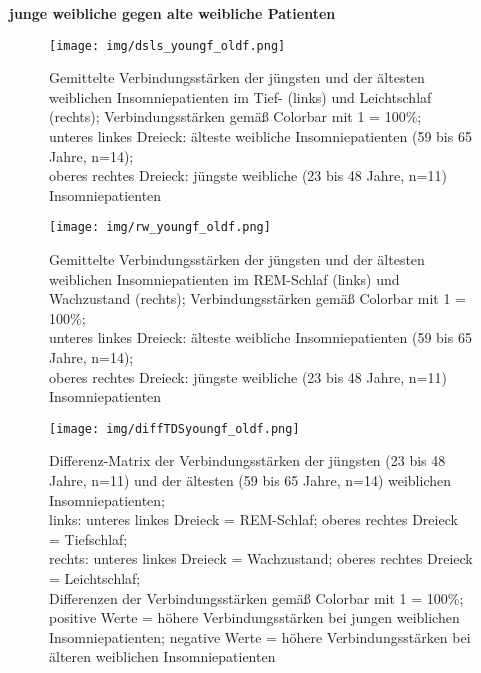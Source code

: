 \textbf{junge weibliche gegen alte weibliche Patienten}





\begin{figure}[H]
	\centering
	\texttt{[image: img/dsls\_youngf\_oldf.png]}
	\caption[Verbindungsstärken der jüngsten und der ältesten weiblichen Insomniepatienten im Tief- und Leichtschlaf]{Gemittelte Verbindungsstärken der jüngsten und der ältesten weiblichen Insomniepatienten im Tief- (links) und Leichtschlaf (rechts); Verbindungsstärken gemäß Colorbar mit 1 = 100\%;\\unteres linkes Dreieck: älteste weibliche Insomniepatienten (59 bis 65 Jahre, n=14);\\oberes rechtes Dreieck: jüngste weibliche (23 bis 48 Jahre, n=11) Insomniepatienten}
	\label{fig:dsls_youngf_oldf}
\end{figure}

\begin{figure}[H]
	\centering
	\texttt{[image: img/rw\_youngf\_oldf.png]}
	\caption[Verbindungsstärken der jüngsten und der ältesten weiblichen Insomniepatienten im REM-Schlaf und Wachzustand]{Gemittelte Verbindungsstärken der jüngsten und der ältesten weiblichen Insomniepatienten im REM-Schlaf (links) und Wachzustand (rechts); Verbindungsstärken gemäß Colorbar mit 1 = 100\%;\\unteres linkes Dreieck: älteste weibliche Insomniepatienten (59 bis 65 Jahre, n=14);\\oberes rechtes Dreieck: jüngste weibliche (23 bis 48 Jahre, n=11) Insomniepatienten}
	\label{fig:rw_youngf_oldf}
\end{figure}

\begin{figure}[H]
	\centering
	\texttt{[image: img/diffTDSyoungf\_oldf.png]}
	\caption[Differenz-Matrix der Verbindungsstärken der jüngsten und ältesten weiblichen Insomniepatienten]{Differenz-Matrix der Verbindungsstärken der jüngsten (23 bis 48 Jahre, n=11) und der ältesten (59 bis 65 Jahre, n=14) weiblichen Insomniepatienten;\\links: unteres linkes Dreieck = REM-Schlaf; oberes rechtes Dreieck = Tiefschlaf;\\rechts: unteres linkes Dreieck = Wachzustand; oberes rechtes Dreieck = Leichtschlaf;\\Differenzen der Verbindungsstärken gemäß Colorbar mit 1 = 100\%;\\positive Werte = höhere Verbindungsstärken bei jungen weiblichen Insomniepatienten; negative Werte = höhere Verbindungsstärken bei älteren weiblichen Insomniepatienten}
	\label{fig:diffTDSyoungf_oldf}
\end{figure}



